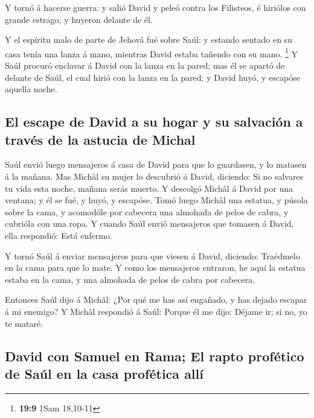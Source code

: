 Y tornó á hacerse guerra: y salió David y peleó contra los
Filisteos, é hiriólos con grande estrago, y huyeron delante de él.

 Y el espíritu malo de parte de Jehová fué sobre Saúl: y
estando sentado en su casa tenía una lanza á mano, mientras David estaba
tañendo con su mano. \footnote{\textbf{19:9} 1Sam 18,10-11}
 Y Saúl procuró enclavar á David con la lanza en la pared;
mas él se apartó de delante de Saúl, el cual hirió con la lanza en la
pared; y David huyó, y escapóse aquella noche.

\hypertarget{el-escape-de-david-a-su-hogar-y-su-salvaciuxf3n-a-travuxe9s-de-la-astucia-de-michal}{%
\subsection{El escape de David a su hogar y su salvación a través de la
astucia de
Michal}\label{el-escape-de-david-a-su-hogar-y-su-salvaciuxf3n-a-travuxe9s-de-la-astucia-de-michal}}

 Saúl envió luego mensajeros á casa de David para que lo
guardasen, y lo matasen á la mañana. Mas Michâl su mujer lo descubrió á
David, diciendo: Si no salvares tu vida esta noche, mañana serás muerto.
 Y descolgó Michâl á David por una ventana; y él se fué, y
huyó, y escapóse.  Tomó luego Michâl una estatua, y púsola
sobre la cama, y acomodóle por cabecera una almohada de pelos de cabra,
y cubrióla con una ropa.  Y cuando Saúl envió mensajeros
que tomasen á David, ella respondió: Está enfermo.

 Y tornó Saúl á enviar mensajeros para que viesen á David,
diciendo: Traédmelo en la cama para que lo mate.  Y como
los mensajeros entraron, he aquí la estatua estaba en la cama, y una
almohada de pelos de cabra por cabecera.

 Entonces Saúl dijo á Michâl: ¿Por qué me has así engañado,
y has dejado escapar á mi enemigo? Y Michâl respondió á Saúl: Porque él
me dijo: Déjame ir; si no, yo te mataré.

\hypertarget{david-con-samuel-en-rama-el-rapto-profuxe9tico-de-sauxfal-en-la-casa-profuxe9tica-alluxed}{%
\subsection{David con Samuel en Rama; El rapto profético de Saúl en la
casa profética
allí}\label{david-con-samuel-en-rama-el-rapto-profuxe9tico-de-sauxfal-en-la-casa-profuxe9tica-alluxed}}

